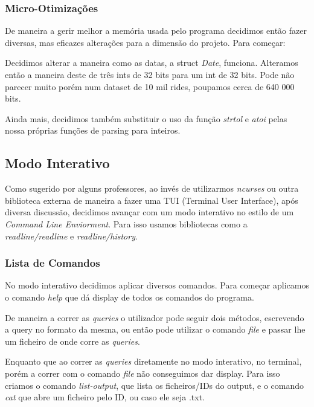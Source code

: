 \documentclass{article}
\begin{document}
        \subsubsection{Micro-Otimizações}
            De maneira a gerir melhor a memória usada pelo programa decidimos então
            fazer diversas, mas eficazes alterações para a dimensão do projeto.
            Para começar:
            
            Decidimos alterar a maneira como as datas, a struct \emph{Date},
            funciona. Alteramos então a maneira deste de três ints de 32 bits para um int de 32 bits.
            Pode não parecer muito porém num dataset de 10 mil rides, poupamos cerca de 
            640 000 bits.
            
            Ainda mais, decidimos também substituir o uso da função \emph{strtol} e \emph{atoi}
            pelas nossa próprias funções de parsing para inteiros.
    \newpage
    \subsection{Modo Interativo}
            Como sugerido por alguns professores, ao invés de utilizarmos \emph{ncurses} ou outra 
            biblioteca externa de maneira a fazer uma TUI (Terminal User Interface), após diversa 
            discussão, decidimos avançar com um modo interativo no estilo de um \emph{Command Line 
            Enviorment}. Para isso usamos bibliotecas como a \emph{readline/readline} e 
            \emph{readline/history}. 
        \subsubsection{Lista de Comandos}
            No modo interativo decidimos aplicar diversos comandos.
            Para começar aplicamos o comando \emph{help} que dá display de todos os comandos do programa.

            De maneira a correr as \emph{queries} o utilizador pode seguir dois métodos, escrevendo a query
            no formato da mesma, ou então pode utilizar o comando \emph{file} e passar lhe um ficheiro de 
            onde corre as \emph{queries}. 

            Enquanto que ao correr as \emph{queries} diretamente no modo interativo, no terminal, porém a
            correr com o comando \emph{file} não conseguimos dar display. Para isso criamos o comando
            \emph{list-output}, que lista os ficheiros/IDs do output, e o comando \emph{cat} que abre um 
            ficheiro pelo ID, ou caso ele seja .txt.
\end{document}
